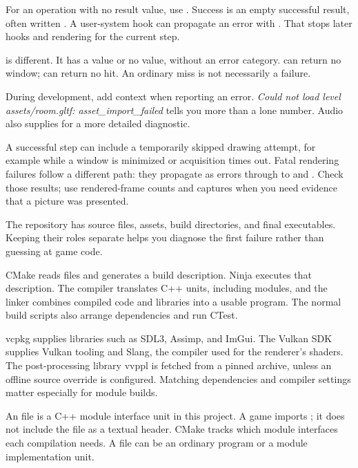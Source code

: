 \documentclass[11pt,a4paper]{article}
\begin{document}
For an operation with no result value, use . Success is an empty successful result, often written . A user-system hook can propagate an error with . That stops later hooks and rendering for the current step.

 is different. It has a value or no value, without an error category.  can return no window;  can return no hit. An ordinary miss is not necessarily a failure.

During development, add context when reporting an error. \emph{Could not load level assets/room.gltf: asset\_import\_failed} tells you more than a lone number. Audio also supplies  for a more detailed diagnostic.

A successful step can include a temporarily skipped drawing attempt, for example while a window is minimized or acquisition times out. Fatal rendering failures follow a different path: they propagate as errors through  to  and . Check those results; use rendered-frame counts and captures when you need evidence that a picture was presented.

The repository has source files, assets, build directories, and final executables. Keeping their roles separate helps you diagnose the first failure rather than guessing at game code.

CMake reads  files and generates a build description. Ninja executes that description. The compiler translates C++ units, including modules, and the linker combines compiled code and libraries into a usable program. The normal build scripts also arrange dependencies and run CTest.

vcpkg supplies libraries such as SDL3, Assimp, and ImGui. The Vulkan SDK supplies Vulkan tooling and Slang, the compiler used for the renderer's shaders. The post-processing library vvppl is fetched from a pinned archive, unless an offline source override is configured. Matching dependencies and compiler settings matter especially for module builds.

An  file is a C++ module interface unit in this project. A game imports ; it does not include the  file as a textual header. CMake tracks which module interfaces each compilation needs. A  file can be an ordinary program or a module implementation unit.
\end{document}
